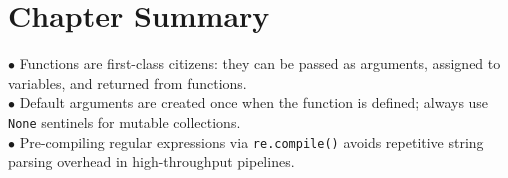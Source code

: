 \section{Chapter Summary}
\begin{summarybox}
$\bullet$ Functions are first-class citizens: they can be passed as arguments, assigned to variables, and returned from functions.\\
$\bullet$ Default arguments are created once when the function is defined; always use \texttt{None} sentinels for mutable collections.\\
$\bullet$ Pre-compiling regular expressions via \texttt{re.compile()} avoids repetitive string parsing overhead in high-throughput pipelines.
\end{summarybox}
